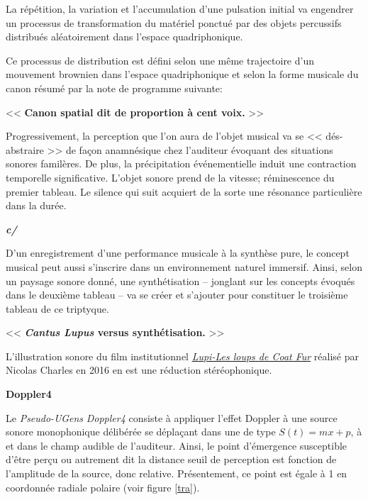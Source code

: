  La r\'{e}p\'{e}tition, la variation et l'accumulation d'une pulsation initial va engendrer un processus de transformation du mat\'{e}riel ponctu\'{e} par des objets percussifs distribu\'{e}s al\'{e}atoirement dans l'espace quadriphonique.
 
Ce processus de distribution est d\'{e}fini selon une m\^eme trajectoire d'un mouvement brownien dans l'espace quadriphonique et selon la forme musicale du canon r\'{e}sum\'{e} par la note de programme suivante:

\bigskip

 << \textbf{Canon spatial dit de proportion \`{a} cent voix.} >>
 
 \bigskip

 Progressivement, la perception que l'on aura de l'objet musical va se << d\'{e}s-abstraire >> de fa\c{c}on anamn\'{e}sique chez l'auditeur \'{e}voquant des situations sonores famil\`{e}res. 
De plus, la pr\'{e}cipitation \'{e}v\'{e}nementielle induit une contraction temporelle significative. L'objet sonore prend de la vitesse; r\'{e}minescence du premier tableau. Le silence qui suit acquiert de la sorte une r\'{e}sonance particuli\`{e}re dans la dur\'{e}e.

\bigskip
\bigskip

 \textbf{\textit{c/}}
 
 D'un enregistrement d'une performance musicale \`{a} la synth\`{e}se pure, le concept musical peut aussi s'inscrire dans un environnement naturel immersif. Ainsi, selon un paysage sonore donn\'{e}, une synth\'{e}tisation -- jonglant sur les concepts \'{e}voqu\'{e}s dans le deuxi\`{e}me tableau -- va se cr\'{e}er et s'ajouter pour constituer le troisi\`{e}me tableau de ce triptyque.     

\bigskip

  << \textbf{\textit{Cantus Lupus} versus synth\'{e}tisation.} >>
  
  \bigskip
  L'illustration sonore du film institutionnel \href{http://refugedesloups.org/video/version\%203\%20refuge\%20des\%20loups.mp4}{\textit{Lupi-Les loups de Coat Fur}} r\'ealis\'e par Nicolas Charles en 2016 en est une r\'eduction st\'er\'eophonique. 
  
  \bigskip
\bigskip
  \bigskip

\noindent \textbf{{\large Doppler4}}
\hrulefill
\label{dop}

  \bigskip

Le \textit{Pseudo-UGens}  \textsl{Doppler4} consiste \`a appliquer l'effet Doppler \`a une source sonore monophonique d\'elib\'er\'ee se d\'epla\c{c}ant dans une  de type $S(t)=m x +p$, \`a  et dans le champ audible de l'auditeur. Ainsi, le point d'\'emergence susceptible d'\^etre per\c{c}u ou autrement dit la distance seuil de perception est fonction de l'amplitude de la source, donc relative. Pr\'esentement, ce point est \'egale \`a 1 en coordonn\'ee radiale polaire (voir figure \ref{tra}). 

